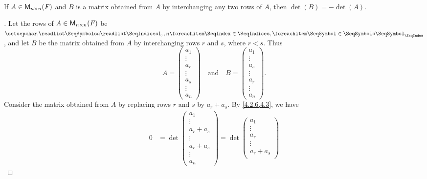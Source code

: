 \begin{thm}\label{4.5}
	If \(A \in \mathsf{M}_{{n} \times n}({\mathit{F}})\) and \(B\) is a matrix obtained from \(A\) by interchanging any two rows of \(A\), then \(\det(B) = -\det(A)\).
\end{thm}

\begin{proof}[]
	Let the rows of \(A \in \mathsf{M}_{{n} \times n}({\mathit{F}})\) be \(\seq{a}{1,,n}\), and let \(B\) be the matrix obtained from \(A\) by interchanging rows \(r\) and \(s\), where \(r < s\).
	Thus
	\[
		A = \begin{pmatrix}
			a_1    \\
			\vdots \\
			a_r    \\
			\vdots \\
			a_s    \\
			\vdots \\
			a_n
		\end{pmatrix} \quad \text{and} \quad B = \begin{pmatrix}
			a_1    \\
			\vdots \\
			a_s    \\
			\vdots \\
			a_r    \\
			\vdots \\
			a_n
		\end{pmatrix}.
	\]
	Consider the matrix obtained from \(A\) by replacing rows \(r\) and \(s\) by \(a_r + a_s\).
	By \cref{4.2.6,4.3}, we have
	\begin{align*}
		0 & = \det\begin{pmatrix}
			          a_1       \\
			          \vdots    \\
			          a_r + a_s \\
			          \vdots    \\
			          a_r + a_s \\
			          \vdots    \\
			          a_n
		          \end{pmatrix} = \det\begin{pmatrix}
			                              a_1       \\
			                              \vdots    \\
			                              a_r       \\
			                              \vdots    \\
			                              a_r + a_s \\

\end{pmatrix}
\end{align*}
\end{proof}
